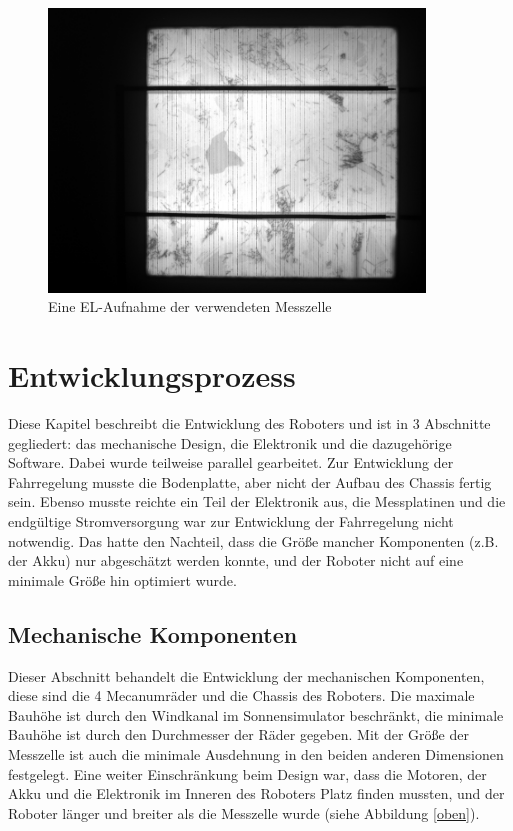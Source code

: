 \documentclass[a4paper,bibtotoc,oneside]{scrbook}
\begin{document}
\begin{figure}[htbp]
\centering
\includegraphics[width=100mm]{img/el.png}
\caption{Eine EL-Aufnahme der verwendeten Messzelle}\label{el}
\end{figure}

\chapter{Entwicklungsprozess}\thispagestyle{empty}

Diese Kapitel beschreibt die Entwicklung des Roboters und ist in 3 Abschnitte gegliedert: das mechanische Design, die Elektronik und die dazugehörige Software.
Dabei wurde teilweise parallel gearbeitet. Zur Entwicklung der Fahrregelung musste die Bodenplatte, aber nicht der Aufbau des Chassis fertig sein. Ebenso musste reichte ein Teil der Elektronik aus, die Messplatinen und die endgültige Stromversorgung war zur Entwicklung der Fahrregelung nicht notwendig. Das hatte den Nachteil, dass die Größe mancher Komponenten (z.B. der Akku) nur abgeschätzt werden konnte, und der Roboter nicht auf eine minimale Größe hin optimiert wurde.

\section{Mechanische Komponenten}\thispagestyle{empty}

Dieser Abschnitt behandelt die Entwicklung der mechanischen Komponenten, diese sind die 4 Mecanumräder und die Chassis des Roboters. Die maximale Bauhöhe ist durch den Windkanal im Sonnensimulator beschränkt, die minimale Bauhöhe ist durch den Durchmesser der Räder gegeben.
Mit der Größe der Messzelle ist auch die minimale Ausdehnung in den beiden anderen Dimensionen festgelegt. Eine weiter Einschränkung beim Design war, dass die Motoren, der Akku und die Elektronik im Inneren des Roboters Platz finden mussten, und der Roboter länger und breiter als die Messzelle wurde (siehe Abbildung \ref{oben}).
\end{document}
